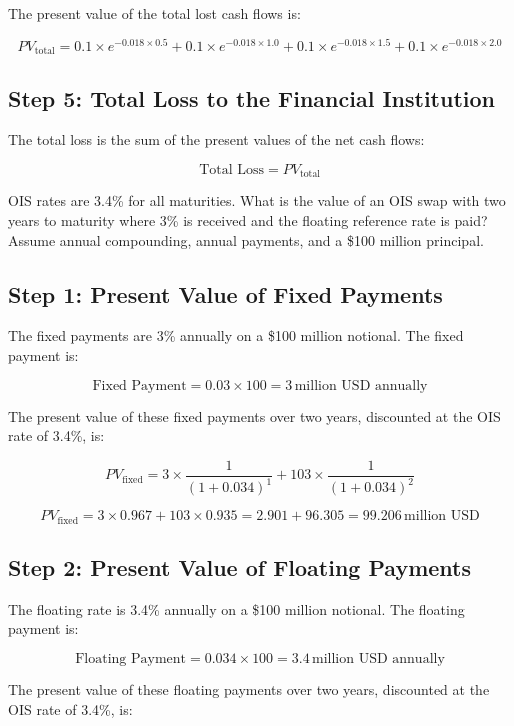 \documentclass[12pt,letterpaper, onecolumn]{exam}
\begin{document}
\begin{questions}
\begin{solution}
The present value of the total lost cash flows is:

\[
PV_{\text{total}} = 0.1 \times e^{-0.018 \times 0.5} + 0.1 \times e^{-0.018 \times 1.0} + 0.1 \times e^{-0.018 \times 1.5} + 0.1 \times e^{-0.018 \times 2.0}
\]

\subsection*{Step 5: Total Loss to the Financial Institution}
The total loss is the sum of the present values of the net cash flows:

\[
\text{Total Loss} = PV_{\text{total}}
\]


\end{solution}


    \newpage
    \question OIS rates are 3.4\% for all maturities. What is the value of an OIS swap with two years to maturity where 3\% is received and the floating reference rate is paid? Assume annual compounding, annual payments, and a \$100 million principal.

    \begin{solution}
\subsection*{Step 1: Present Value of Fixed Payments}
The fixed payments are 3\% annually on a \$100 million notional. The fixed payment is:

\[
\text{Fixed Payment} = 0.03 \times 100 = 3 \, \text{million USD annually}
\]

The present value of these fixed payments over two years, discounted at the OIS rate of 3.4\%, is:

\[
PV_{\text{fixed}} = 3 \times \frac{1}{(1 + 0.034)^1} + 103 \times \frac{1}{(1 + 0.034)^2}
\]

\[
PV_{\text{fixed}} = 3 \times 0.967 + 103 \times 0.935 = 2.901 + 96.305 = 99.206 \, \text{million USD}
\]

\subsection*{Step 2: Present Value of Floating Payments}
The floating rate is 3.4\% annually on a \$100 million notional. The floating payment is:

\[
\text{Floating Payment} = 0.034 \times 100 = 3.4 \, \text{million USD annually}
\]

The present value of these floating payments over two years, discounted at the OIS rate of 3.4\%, is:


\end{solution}
\end{questions}
\end{document}
